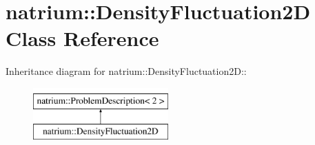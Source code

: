 \hypertarget{classnatrium_1_1DensityFluctuation2D}{
\section{natrium::DensityFluctuation2D Class Reference}
\label{classnatrium_1_1DensityFluctuation2D}
}
Inheritance diagram for natrium::DensityFluctuation2D::\begin{figure}[H]
\begin{center}
\leavevmode
\includegraphics[height=2cm]{classnatrium_1_1DensityFluctuation2D}
\end{center}
\end{figure}
